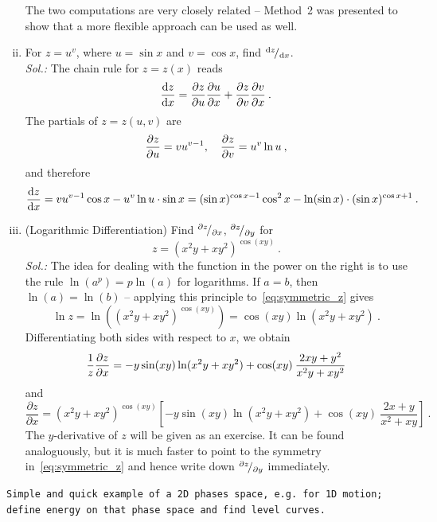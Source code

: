 \begin{example}
\begin{enumerate}[(i)]
	The two computations are very closely related -- Method~2 was presented to show that a more flexible approach can be used as well.
	\item For $z=u^v$, where $u=\sin x$ and $v=\cos x$, find ${}^{\mathrm{d} z}\!/_{\mathrm{d} x}$. \\
	{\it Sol.:} The chain rule for $z=z(x)$ reads
	\[
	\displaystyle{\frac{\mathrm{d}z}{\mathrm{d}x}} =\displaystyle{\frac{\partial z}{\partial u}} \displaystyle{\frac{\partial u}{\partial x}} + \displaystyle{\frac{\partial z}{\partial v}} \displaystyle{\frac{\partial v}{\partial x}}
	\:. \]
	The partials of $z = z (u,v)$ are
	\[
	\displaystyle{\frac{\partial z}{\partial u}} = v u^{v-1}, \quad \displaystyle{\frac{\partial z}{\partial v}}= u^v \ln u
	\:, \]
	and therefore
	\[
	\displaystyle{\frac{\mathrm{d}z}{\mathrm{d}x}} = v u^{v-1} \cos x - u^v \ln u \cdot \sin x
	=(\sin x)^{\cos x -1}  \cos^2 x -   \ln (\sin x) \cdot (\sin x)^{\cos x +1}
	\:. \]
	\item (Logarithmic Differentiation) Find ${}^{\partial z}\!/_{\partial x}$, ${}^{\partial z}\!/_{\partial y}$  for
	\begin{equation}
	\label{eq:symmetric_z}
	z=(x^2y+xy^2)^{\cos(xy)} \:.
	\end{equation} 
	{\it Sol.:}
	The idea for dealing with the function in the power on the right is to use the rule $\ln(a^p)=p\ln(a)$ for logarithms. If $a=b$, then $\ln(a)=\ln(b)$ -- applying this principle to~\eqref{eq:symmetric_z} gives
	\[
	\ln z = \ln\left( (x^2y+xy^2)^{\cos(xy)} \right) = \cos(xy) \ln(x^2y+xy^2)
	\:. \]
	Differentiating both sides with respect to $x$, we obtain
	\[
	\frac{1}{z} \displaystyle{\frac{\partial z}{\partial x}} = -y \sin(xy) \ln(x^2y+xy^2)
	 + \cos(xy) \: \frac{2xy+y^2}{x^2y+xy^2}
	\]
	and
	\[
	\frac{\partial z}{\partial x} =  (x^2y+xy^2)^{\cos(xy)} \left[
	-y \sin (xy) \ln (x^2y+xy^2)+ \cos(xy) \: \frac{2x+y}{x^2+xy}
	\right]
	\:. \]
	The $y$-derivative of $z$ will be given as an exercise. It can be found analoguously, but it is much faster to point to the symmetry in~\eqref{eq:symmetric_z} and hence write down ${}^{\partial z}\!/_{\partial y}$ immediately.
\end{enumerate}
\end{example}

\begin{application}
\texttt{Simple and quick example of a 2D phases space, e.g. for 1D motion; define energy on that phase space and find level curves.}
\end{application}


